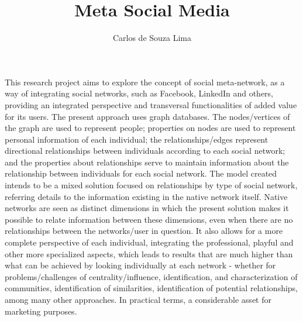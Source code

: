\documentclass[a4paper,twoside]{report}
\begin{document}

\title{Meta Social Media}

\author{Carlos de Souza Lima}


\beforepreface

This research project aims to explore the concept of social meta-network, as a way of integrating social networks, such as Facebook, LinkedIn and others, providing an integrated perspective and transversal functionalities of added value for its users. The present approach uses graph databases. The nodes/vertices of the graph are used to represent people; properties on nodes are used to represent personal information of each individual; the relationships/edges represent directional relationships between individuals according to each social network; and the properties about relationships serve to maintain information about the relationship between individuals for each social network. The model created intends to be a mixed solution focused on relationships by type of social network, referring details to the information existing in the native network itself. Native networks are seen as distinct dimensions in which the present solution makes it possible to relate information between these dimensions, even when there are no relationships between the networks/user in question. It also allows for a more complete perspective of each individual, integrating the professional, playful and other more specialized aspects, which leads to results that are much higher than what can be achieved by looking individually at each network - whether for problems/challenges of centrality/influence, identification, and characterization of communities, identification of similarities, identification of potential relationships, among many other approaches. In practical terms, a considerable asset for marketing purposes.

\afterpreface

\bodystart
 







%
\end{document}
